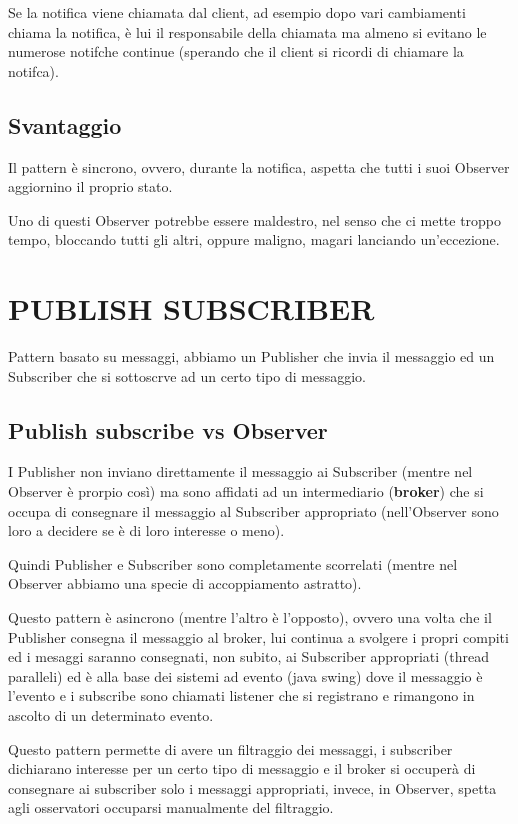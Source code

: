Se la notifica viene chiamata dal client, ad esempio dopo vari cambiamenti chiama la notifica, è lui il responsabile della chiamata ma almeno si evitano le numerose 
notifche continue (sperando che il client si ricordi di chiamare la notifca).

\section{Svantaggio}

Il pattern è sincrono, ovvero, durante la notifica, aspetta che tutti i suoi Observer aggiornino il proprio stato.

Uno di questi Observer potrebbe essere maldestro, nel senso che ci mette troppo tempo, bloccando tutti gli altri, oppure maligno, magari lanciando un'eccezione.

\chapter{PUBLISH SUBSCRIBER}

Pattern basato su messaggi, abbiamo un Publisher che invia il messaggio ed un Subscriber che si sottoscrve ad un certo tipo di messaggio.

\section{Publish subscribe vs Observer}

I Publisher non inviano direttamente il messaggio ai Subscriber (mentre nel Observer è prorpio così) ma sono affidati ad un intermediario (\textbf{broker}) che si 
occupa di consegnare il messaggio al Subscriber appropriato (nell'Observer sono loro a decidere se è di loro interesse o meno).

Quindi Publisher e Subscriber sono completamente scorrelati (mentre nel Observer abbiamo una specie di accoppiamento astratto).

Questo pattern è asincrono (mentre l'altro è l'opposto), ovvero una volta che il Publisher consegna il messaggio al broker, lui continua a svolgere i propri compiti 
ed i mesaggi saranno consegnati, non subito, ai Subscriber appropriati (thread paralleli) ed è alla base dei sistemi ad evento (java swing) dove il messaggio è l'evento 
e i subscribe sono chiamati listener che si registrano e rimangono in ascolto di un determinato evento.

Questo pattern permette di avere un filtraggio dei messaggi, i subscriber dichiarano interesse per un certo tipo di messaggio e il broker si occuperà di consegnare ai 
subscriber solo i messaggi appropriati, invece, in Observer, spetta agli osservatori occuparsi manualmente del filtraggio.
